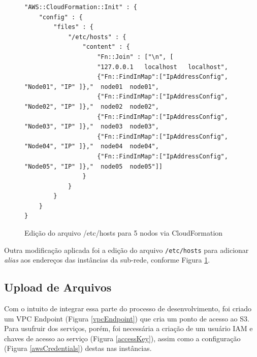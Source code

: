 \documentclass[tg]{mdtufsm}
\begin{document}
\begin{figure}
\centering
\begin{lstlisting}[frame=single, numbers=none]
"AWS::CloudFormation::Init" : {
	"config" : {
		"files" : {
			"/etc/hosts" : {
				"content" : {
					"Fn::Join" : ["\n", [
					"127.0.0.1   localhost   localhost",
					{"Fn::FindInMap":["IpAddressConfig", "Node01", "IP" ]},"  node01  node01",
					{"Fn::FindInMap":["IpAddressConfig", "Node02", "IP" ]},"  node02  node02",
					{"Fn::FindInMap":["IpAddressConfig", "Node03", "IP" ]},"  node03  node03",
					{"Fn::FindInMap":["IpAddressConfig", "Node04", "IP" ]},"  node04  node04",
					{"Fn::FindInMap":["IpAddressConfig", "Node05", "IP" ]},"  node05  node05"]]
				}
			}
		}	
	}
}
\end{lstlisting}
\caption{Edição do arquivo /etc/hosts para 5 nodos via CloudFormation}
\label{hostFile}
\end{figure}

Outra modificação aplicada foi a edição do arquivo \verb|/etc/hosts| para adicionar \emph{alias} aos endereços das instâncias da sub-rede, conforme Figura \ref{hostFile}.


\subsection{Upload de Arquivos}

Com o intuito de integrar essa parte do processo de desenvolvimento, foi criado um VPC Endpoint (Figura \ref{vpcEndpoint}) que cria um ponto de acesso ao S3. Para usufruir dos serviços, porém, foi necessária a criação de um usuário IAM e chaves de acesso ao serviço (Figura \ref{accessKey}), assim como a configuração (Figura \ref{awsCredentials}) destas nas instâncias.
\end{document}
